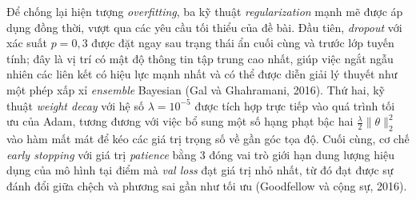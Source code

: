 Để chống lại hiện tượng \textit{overfitting}, ba kỹ thuật \textit{regularization} mạnh mẽ được áp dụng đồng thời, vượt qua các yêu cầu tối thiểu của đề bài. Đầu tiên, \textit{dropout} với xác suất $p=0,3$ được đặt ngay sau trạng thái ẩn cuối cùng và trước lớp tuyến tính; đây là vị trí có mật độ thông tin tập trung cao nhất, giúp việc ngắt ngẫu nhiên các liên kết có hiệu lực mạnh nhất và có thể được diễn giải lý thuyết như một phép xấp xỉ \textit{ensemble} Bayesian (Gal và Ghahramani, 2016). Thứ hai, kỹ thuật \textit{weight decay} với hệ số $\lambda=10^{-5}$ được tích hợp trực tiếp vào quá trình tối ưu của Adam, tương đương với việc bổ sung một số hạng phạt bậc hai $\frac{\lambda}{2}\|\theta\|_2^2$ vào hàm mất mát để kéo các giá trị trọng số về gần góc tọa độ. Cuối cùng, cơ chế \textit{early stopping} với giá trị \textit{patience} bằng 3 đóng vai trò giới hạn dung lượng hiệu dụng của mô hình tại điểm mà \textit{val loss} đạt giá trị nhỏ nhất, từ đó đạt được sự đánh đổi giữa chệch và phương sai gần như tối ưu (Goodfellow và cộng sự, 2016).